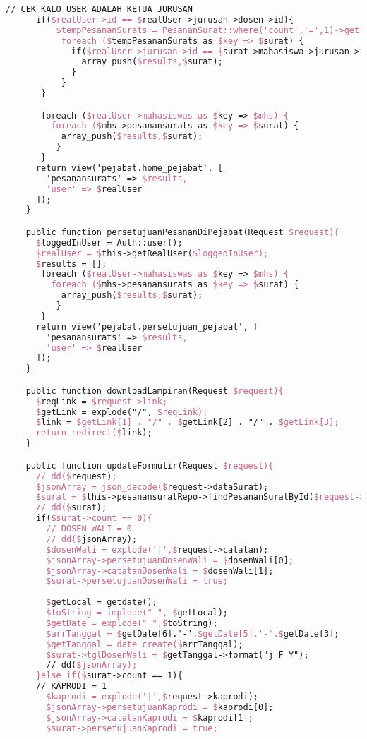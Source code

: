 \begin{lstlisting}[language=tex,basicstyle=\tiny,caption=PesanansuratController.php]
      // CEK KALO USER ADALAH KETUA JURUSAN
      if($realUser->id == $realUser->jurusan->dosen->id){
          $tempPesananSurats = PesananSurat::where('count','=',1)->get();
           foreach ($tempPesananSurats as $key => $surat) {
             if($realUser->jurusan->id == $surat->mahasiswa->jurusan->id){
               array_push($results,$surat);
             }
           }
       }

       foreach ($realUser->mahasiswas as $key => $mhs) {
         foreach ($mhs->pesanansurats as $key => $surat) {
           array_push($results,$surat);
          }
       }
      return view('pejabat.home_pejabat', [
        'pesanansurats' => $results,
        'user' => $realUser
      ]);    
    }

    public function persetujuanPesananDiPejabat(Request $request){
      $loggedInUser = Auth::user();
      $realUser = $this->getRealUser($loggedInUser);
      $results = [];
       foreach ($realUser->mahasiswas as $key => $mhs) {
         foreach ($mhs->pesanansurats as $key => $surat) {
           array_push($results,$surat);
          }
       }
      return view('pejabat.persetujuan_pejabat', [
        'pesanansurats' => $results,
        'user' => $realUser
      ]);    
    }

    public function downloadLampiran(Request $request){
      $reqLink = $request->link;
      $getLink = explode("/", $reqLink);
      $link = $getLink[1] . "/" . $getLink[2] . "/" . $getLink[3];
      return redirect($link);
    }

    public function updateFormulir(Request $request){
      // dd($request);
      $jsonArray = json_decode($request->dataSurat);
      $surat = $this->pesanansuratRepo->findPesananSuratById($request->idPesanansurat);
      // dd($surat);
      if($surat->count == 0){
        // DOSEN WALI = 0
        // dd($jsonArray);
        $dosenWali = explode('|',$request->catatan);
        $jsonArray->persetujuanDosenWali = $dosenWali[0];
        $jsonArray->catatanDosenWali = $dosenWali[1];
        $surat->persetujuanDosenWali = true;
        
        $getLocal = getdate();
        $toString = implode(" ", $getLocal);
        $getDate = explode(" ",$toString);
        $arrTanggal = $getDate[6].'-'.$getDate[5].'-'.$getDate[3];
        $getTanggal = date_create($arrTanggal);
        $surat->tglDosenWali = $getTanggal->format("j F Y");
        // dd($jsonArray);
      }else if($surat->count == 1){
      // KAPRODI = 1
        $kaprodi = explode('|',$request->kaprodi);
        $jsonArray->persetujuanKaprodi = $kaprodi[0];
        $jsonArray->catatanKaprodi = $kaprodi[1];
        $surat->persetujuanKaprodi = true;


\end{lstlisting}
